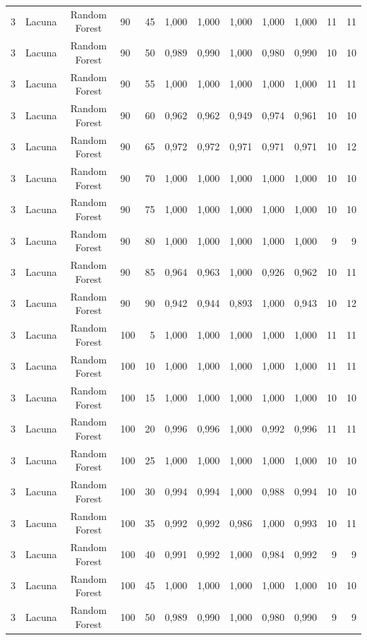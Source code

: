 \begin{longtable}{ccclrrrrrrrr}
3 & Lacuna & Random Forest & 90 & 45 & 1,000 & 1,000 & 1,000 & 1,000 & 1,000 & 11 & 11 \\
3 & Lacuna & Random Forest & 90 & 50 & 0,989 & 0,990 & 1,000 & 0,980 & 0,990 & 10 & 10 \\
3 & Lacuna & Random Forest & 90 & 55 & 1,000 & 1,000 & 1,000 & 1,000 & 1,000 & 11 & 11 \\
3 & Lacuna & Random Forest & 90 & 60 & 0,962 & 0,962 & 0,949 & 0,974 & 0,961 & 10 & 10 \\
3 & Lacuna & Random Forest & 90 & 65 & 0,972 & 0,972 & 0,971 & 0,971 & 0,971 & 10 & 12 \\
3 & Lacuna & Random Forest & 90 & 70 & 1,000 & 1,000 & 1,000 & 1,000 & 1,000 & 10 & 10 \\
3 & Lacuna & Random Forest & 90 & 75 & 1,000 & 1,000 & 1,000 & 1,000 & 1,000 & 10 & 10 \\
3 & Lacuna & Random Forest & 90 & 80 & 1,000 & 1,000 & 1,000 & 1,000 & 1,000 & 9 & 9 \\
3 & Lacuna & Random Forest & 90 & 85 & 0,964 & 0,963 & 1,000 & 0,926 & 0,962 & 10 & 11 \\
3 & Lacuna & Random Forest & 90 & 90 & 0,942 & 0,944 & 0,893 & 1,000 & 0,943 & 10 & 12 \\
3 & Lacuna & Random Forest & 100 & 5 & 1,000 & 1,000 & 1,000 & 1,000 & 1,000 & 11 & 11 \\
3 & Lacuna & Random Forest & 100 & 10 & 1,000 & 1,000 & 1,000 & 1,000 & 1,000 & 11 & 11 \\
3 & Lacuna & Random Forest & 100 & 15 & 1,000 & 1,000 & 1,000 & 1,000 & 1,000 & 10 & 10 \\
3 & Lacuna & Random Forest & 100 & 20 & 0,996 & 0,996 & 1,000 & 0,992 & 0,996 & 11 & 11 \\
3 & Lacuna & Random Forest & 100 & 25 & 1,000 & 1,000 & 1,000 & 1,000 & 1,000 & 10 & 10 \\
3 & Lacuna & Random Forest & 100 & 30 & 0,994 & 0,994 & 1,000 & 0,988 & 0,994 & 10 & 10 \\
3 & Lacuna & Random Forest & 100 & 35 & 0,992 & 0,992 & 0,986 & 1,000 & 0,993 & 10 & 11 \\
3 & Lacuna & Random Forest & 100 & 40 & 0,991 & 0,992 & 1,000 & 0,984 & 0,992 & 9 & 9 \\
3 & Lacuna & Random Forest & 100 & 45 & 1,000 & 1,000 & 1,000 & 1,000 & 1,000 & 10 & 10 \\
3 & Lacuna & Random Forest & 100 & 50 & 0,989 & 0,990 & 1,000 & 0,980 & 0,990 & 9 & 9 \\

\end{longtable}
